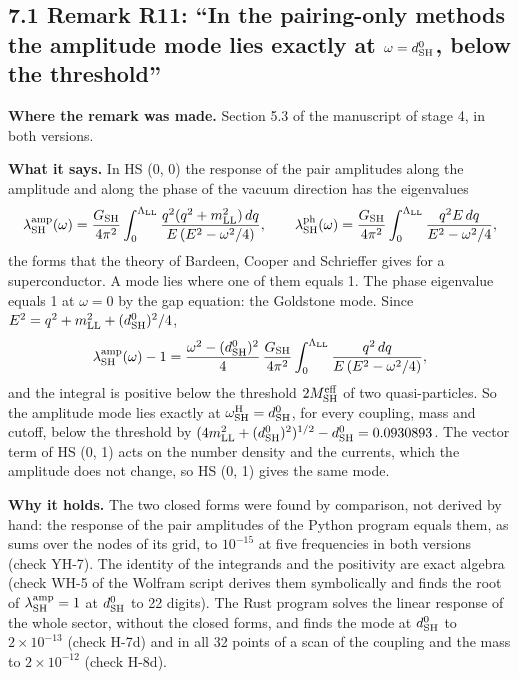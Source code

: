 \documentclass[
  10pt,
]{article}
\begin{document}
\hypertarget{remark-r11-in-the-pairing-only-methods-the-amplitude-mode-lies-exactly-at-omegad0_rm-sh-below-the-threshold}{%
\subsection{\texorpdfstring{7.1 Remark R11: ``In the pairing-only
methods the amplitude mode lies exactly at \(\omega=d^0_{\rm SH}\),
below the
threshold''}{7.1 Remark R11: ``In the pairing-only methods the amplitude mode lies exactly at \textbackslash omega=d\^{}0\_\{\textbackslash rm SH\}, below the threshold''}}\label{remark-r11-in-the-pairing-only-methods-the-amplitude-mode-lies-exactly-at-omegad0_rm-sh-below-the-threshold}}

\textbf{Where the remark was made.} Section 5.3 of the manuscript of
stage 4, in both versions.

\textbf{What it says.} In HS (0, 0) the response of the pair amplitudes
along the amplitude and along the phase of the vacuum direction has the
eigenvalues
\[\lambda^{\rm amp}_{\rm SH}(\omega)=\frac{G_{\rm SH}}{4\pi^2}\int_0^{\Lambda_{\rm LL}}\frac{q^2(q^2+m_{\rm LL}^2)\,dq}{E\,(E^2-\omega^2/4)},\qquad
\lambda^{\rm ph}_{\rm SH}(\omega)=\frac{G_{\rm SH}}{4\pi^2}\int_0^{\Lambda_{\rm LL}}\frac{q^2E\,dq}{E^2-\omega^2/4},\]
the forms that the theory of Bardeen, Cooper and Schrieffer gives for a
superconductor. A mode lies where one of them equals 1. The phase
eigenvalue equals 1 at \(\omega=0\) by the gap equation: the Goldstone
mode. Since \(E^2=q^2+m_{\rm LL}^2+(d^0_{\rm SH})^2/4\),
\[\lambda^{\rm amp}_{\rm SH}(\omega)-1=\frac{\omega^2-(d^0_{\rm SH})^2}{4}\,\frac{G_{\rm SH}}{4\pi^2}\int_0^{\Lambda_{\rm LL}}\frac{q^2\,dq}{E\,(E^2-\omega^2/4)},\]
and the integral is positive below the threshold
\(2M^{\rm eff}_{\rm SH}\) of two quasi-particles. So the amplitude mode
lies exactly at \(\omega^{\rm H}_{\rm SH}=d^0_{\rm SH}\), for every
coupling, mass and cutoff, below the threshold by
\((4m_{\rm LL}^2+(d^0_{\rm SH})^2)^{1/2}-d^0_{\rm SH}=0.0930893\). The
vector term of HS (0, 1) acts on the number density and the currents,
which the amplitude does not change, so HS (0, 1) gives the same mode.

\textbf{Why it holds.} The two closed forms were found by comparison,
not derived by hand: the response of the pair amplitudes of the Python
program equals them, as sums over the nodes of its grid, to \(10^{-15}\)
at five frequencies in both versions (check YH-7). The identity of the
integrands and the positivity are exact algebra (check WH-5 of the
Wolfram script derives them symbolically and finds the root of
\(\lambda^{\rm amp}_{\rm SH}=1\) at \(d^0_{\rm SH}\) to 22 digits). The
Rust program solves the linear response of the whole sector, without the
closed forms, and finds the mode at \(d^0_{\rm SH}\) to
\(2\times10^{-13}\) (check H-7d) and in all 32 points of a scan of the
coupling and the mass to \(2\times10^{-12}\) (check H-8d).
\end{document}
